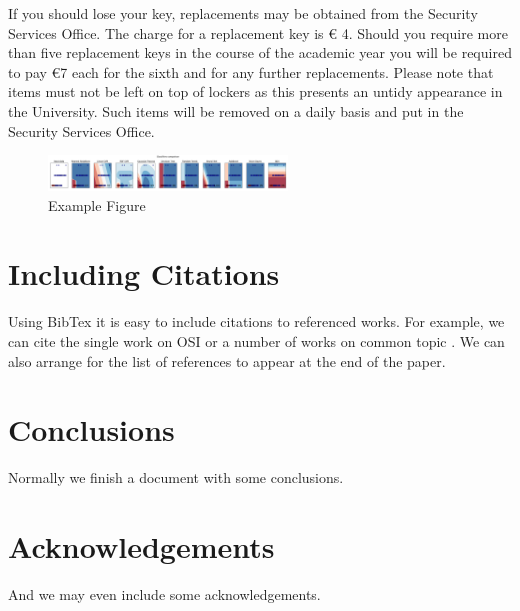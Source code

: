 \documentclass[conference,11pt]{IEEEtran}
\begin{document}
If you should lose your key, replacements may be obtained from the
Security Services Office. The charge for a replacement key is \euro
4. Should you require more than five replacement keys in the course
of the academic year you will be required to pay \euro 7 each for
the sixth and for any further replacements. Please note that items
must not be left on top of lockers as this presents an untidy
appearance in the University. Such items will be removed on a daily
basis and put in the Security Services Office.

\begin{figure}[!t]
\centering
\includegraphics[width=2.5in]{classifiers-comparison-length-subdomains}
\caption{Example Figure}
\label{fig}
\end{figure}

\section{Including Citations}
Using BibTex it is easy to include citations to referenced works.
For example, we can cite the single work on OSI \cite{OSI} or a
number of works on common topic \cite{bellare04security,rfc2616,yi,SSL}.
We can also arrange for the list of references to appear at the end of
the paper.

\section{Conclusions}
Normally we finish a document with some conclusions.

\section*{Acknowledgements}

And we may even include some acknowledgements.



\end{document}
